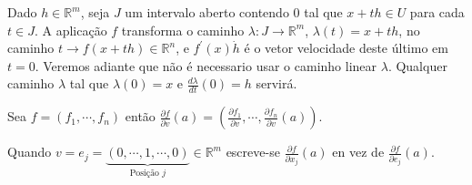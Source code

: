 Dado $h\in\mathbb{R}^{m}$, seja $J$ um intervalo aberto contendo $0$ tal que $x+th\in U$ para cada $t\in J$. A aplicação $f$ transforma o caminho $\lambda:J\to\mathbb{R}^{m}$, $\lambda(t)=x+th$, no caminho $t\to f(x+th)\in\mathbb{R}^{n}$, e $f^\prime(x)\dot h$ é o vetor velocidade deste último em $t=0$. Veremos adiante que não é necessario usar o caminho linear $\lambda$. Qualquer caminho $\lambda$ tal que $\lambda(0)=x$ e $\frac{d\lambda}{dt}(0)=h$ servirá.
\begin{center}
   
\end{center}
Sea $f=\left( f_{1},\cdots,f_{n} \right)$ então $\frac{\partial f}{\partial v}(a)=\left( \frac{\partial f_{1}}{\partial v},\cdots,\frac{\partial f_{n}}{\partial v}(a) \right)$.

Quando $v=e_j=\underbrace{(0,\cdots,1,\cdots,0)}_{\text{Posição }j}\in \mathbb{R}^{m}$ escreve-se $\frac{\partial f}{\partial x_j}(a)$ en vez de $\frac{\partial f}{\partial e_j}(a)$.


